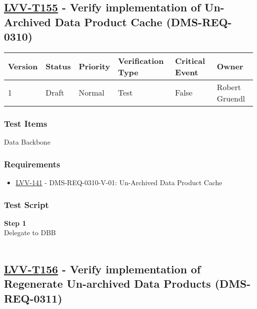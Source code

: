 \hypertarget{lvv-t155---verify-implementation-of-un-archived-data-product-cache-dms-req-0310}{%
\subsection{\texorpdfstring{\href{https://jira.lsstcorp.org/secure/Tests.jspa\#/testCase/LVV-T155}{LVV-T155}
- Verify implementation of Un-Archived Data Product Cache
(DMS-REQ-0310)}{LVV-T155 - Verify implementation of Un-Archived Data Product Cache (DMS-REQ-0310)}}\label{lvv-t155---verify-implementation-of-un-archived-data-product-cache-dms-req-0310}}

\begin{longtable}[]{@{}llllll@{}}
\toprule
Version & Status & Priority & Verification Type & Critical Event &
Owner\tabularnewline
\midrule
\endhead
1 & Draft & Normal & Test & False & Robert Gruendl\tabularnewline
\bottomrule
\end{longtable}

\hypertarget{test-items-131}{%
\subsubsection{Test Items}\label{test-items-131}}

Data Backbone~

\hypertarget{requirements-132}{%
\subsubsection{Requirements}\label{requirements-132}}

\begin{itemize}
\tightlist
\item
  \href{https://jira.lsstcorp.org/browse/LVV-141}{LVV-141} -
  DMS-REQ-0310-V-01: Un-Archived Data Product Cache
\end{itemize}

\hypertarget{test-script-132}{%
\subsubsection{Test Script}\label{test-script-132}}

\textbf{Step 1}\\
Delegate to DBB\\
~\\

\hypertarget{lvv-t156---verify-implementation-of-regenerate-un-archived-data-products-dms-req-0311}{%
\subsection{\texorpdfstring{\href{https://jira.lsstcorp.org/secure/Tests.jspa\#/testCase/LVV-T156}{LVV-T156}
- Verify implementation of Regenerate Un-archived Data Products
(DMS-REQ-0311)}{LVV-T156 - Verify implementation of Regenerate Un-archived Data Products (DMS-REQ-0311)}}\label{lvv-t156---verify-implementation-of-regenerate-un-archived-data-products-dms-req-0311}}

